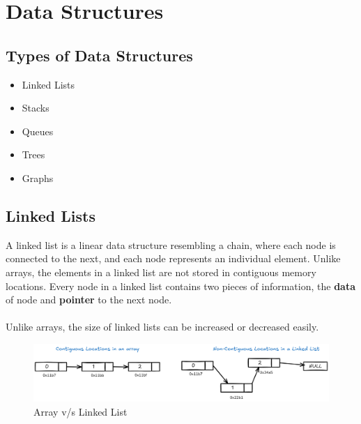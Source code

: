 \documentclass[a4paper, 12pt]{book}
\begin{document}
	\chapter{Data Structures}
	
	\section{Types of Data Structures}
	\begin{itemize}
		\item Linked Lists
		\item Stacks
		\item Queues
		\item Trees
		\item Graphs
	\end{itemize}
	
	\section{Linked Lists}
	A linked list is a linear data structure resembling a chain, where each node is connected to the next, and each node represents an individual element. Unlike arrays, the elements in a linked list are not stored in contiguous memory locations. Every node in a linked list contains two pieces of information, the \textbf{data} of node and \textbf{pointer} to the next node.
	\\ \\
	Unlike arrays, the size of linked lists can be increased or decreased easily.
	\\
	
	\begin{figure}[h]
		\centering
		\includegraphics[width=1.1\textwidth]{LLarray.png}
		\caption{Array v/s Linked List}
		\label{fig:LLvarray}
	\end{figure}
	
	
\end{document}
